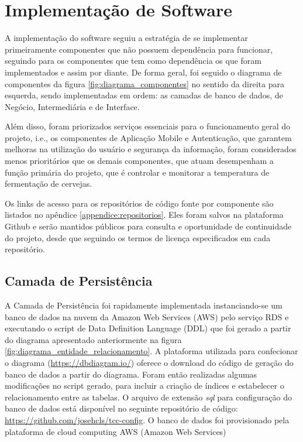 \section{Implementação de Software}

A implementação do software seguiu a estratégia de se implementar primeiramente componentes que não possuem dependência para funcionar, seguindo para os componentes que tem como dependência os que foram implementados e assim por diante. De forma geral, foi seguido o diagrama de componentes da figura \ref{fig:diagrama_componentes} no sentido da direita para esquerda, sendo implementadas em ordem: as camadas de banco de dados, de Negócio, Intermediária e de Interface. 


Além disso, foram priorizados serviços essenciais para o funcionamento geral do projeto, i.e., os componentes de Aplicação Mobile e Autenticação, que garantem melhoras na utilização do usuário e segurança da informação, foram considerados menos prioritários que os demais componentes, que atuam desempenham a função primária do projeto, que é controlar e monitorar a temperatura de fermentação de cervejas.


Os links de acesso para os repositórios de código fonte por componente são listados no apêndice \ref{appendice:repositorios}. Eles foram salvos na plataforma Github e serão mantidos públicos para consulta e oportunidade de continuidade do projeto, desde que seguindo os termos de licença especificados em cada repositório.


\subsection{Camada de Persistência}


A Camada de Persistência foi rapidamente implementada instanciando-se um banco de dados na nuvem da Amazon Web Services (AWS) pelo serviço RDS e executando o script de Data Definition Language (DDL) que foi gerado a partir do diagrama apresentado anteriormente na figura \ref{fig:diagrama_entidade_relacionamento}. A plataforma utilizada para confecionar o diagrama (\url{https://dbdiagram.io/}) oferece o download do código de geração do banco de dados a partir do diagrama. Foram então realizadas algumas modificações no script gerado, para incluir a criação de índices e estabelecer o relacionamento entre as tabelas. O arquivo de extensão \textit{sql} para configuração do banco de dados está disponível no seguinte repositório de código: \url{https://github.com/josehcls/tcc-config}. O banco de dados foi provisionado pela plataforma de cloud computing AWS (Amazon Web Services)  


